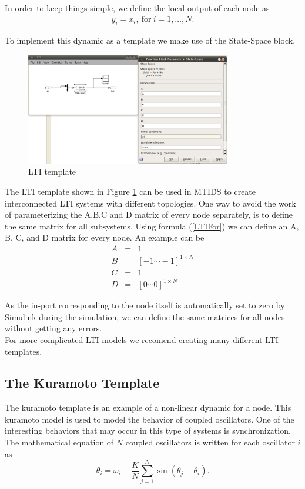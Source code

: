\documentclass[a4paper,twoside, openright,12pt]{report}
\begin{document}
In order to keep things simple, we define the local output of each node as
\begin{eqnarray}
 y_i=  x_i,\ \mbox{for}\ i=1,\ldots,N. 
\end{eqnarray}

To implement this dynamic as a template we make use of the State-Space block.

\begin{figure}[htb]
\centering
\includegraphics[width=0.8\textwidth]{pics/screenLTI.eps}
\caption[MTIDS LTI Template]{LTI template}
\label{templateLTIFig}
\end{figure}
 
The LTI template shown in Figure \ref{templateLTIFig} can be used in MTIDS to create interconnected LTI systems with different topologies. One way to avoid 
the work of parameterizing the A,B,C and D matrix of every node separately, is to define the same matrix for all subsystems. Using formula 
(\ref{LTIFor}) we can define an A, B, C, and D matrix for every node. An example can be
\begin{eqnarray}
 A&=& 1\nonumber\\
B&=&[-1 \cdots -1]^{1\times N}\nonumber\\
C&=& 1\nonumber\\
D&=& [0 \cdots 0] ^{1\times N}\nonumber
\end{eqnarray}

As the in-port corresponding to the node itself is automatically set to zero by Simulink during the simulation, we can define the same matrices for all 
nodes without getting any errors.
\\

For more complicated LTI models we recomend creating many different LTI templates.

\subsection{The Kuramoto Template}
The kuramoto template is an example of a non-linear dynamic for a node. This kuramoto model is used to model the behavior of coupled oscillators. One of the interesting behaviors
that may occur in this type of systems is synchronization. The mathematical equation of $N$ coupled oscillators is written for each oscillator $i$ as
\begin{equation}\label{kuramotoFor}
 \dot{\theta_i} = \omega_i + \frac{K}{N} \sum_{j=1}^N \sin(\theta_j-\theta_i). 
\end{equation}
\end{document}
